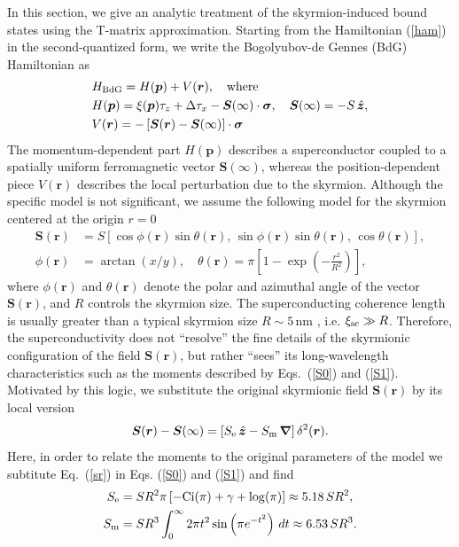 \documentclass[twocolumn,showpacs,floatfix,nofootinbib,longbibliography]{revtex4-1}
\begin{document}
In this section, we give an analytic treatment of the skyrmion-induced bound states using the T-matrix approximation. Starting from the Hamiltonian (\ref{ham}) in the second-quantized form, we write the Bogolyubov-de Gennes (BdG) Hamiltonian as 
\begin{align}
	& H_{\rm BdG} = H(\bm p) + V(\bm r),\quad {\rm where} \nonumber \\
& H(\bm p) = \xi(\bm p)\tau_z+\Delta \tau_x - \bm S(\infty)\cdot\bm\sigma,\quad \bm S(\infty) = -S\,\hat{\bm z}, \nonumber\\
& V(\bm r) = -\left[ \bm S(\bm r)-\bm S(\infty)\right]\cdot\bm\sigma \label{v0}
\end{align}
The momentum-dependent part $H(\bm p)$ describes a superconductor coupled to a spatially uniform ferromagnetic vector $\bm S(\infty)$, whereas the position-dependent piece $V(\bm r)$ describes the local perturbation due to the skyrmion. Although the specific model is not significant, we assume the following model for the skyrmion centered at the origin $r=0$
\begin{align}
	\bm S(\bm r) &= S\left[ \cos\phi(\bm r) \sin\theta(\bm r),\, \sin\phi(\bm r)\sin\theta(\bm r),\,\cos\theta(\bm r)\right], \nonumber \\   
	\phi(\bm r) &= \arctan(x/y),\quad \theta(\bm r) = \pi \left[ 1-\exp\left( -\frac{r^2}{R^2} \right) \right], 	\label{sr}
\end{align}
where $\phi(\bm r)$ and $\theta(\bm r)$ denote the polar and azimuthal angle of the vector $\bm S(\bm r)$, and $R$ controls the skyrmion size. The superconducting coherence length is usually greater than a typical skyrmion size $R\sim 5$\,nm \cite{Heinze2011,Romming2013,Bergmann2014,Brede2014,Sonntag2014,vonBergmann2015,Romming2015}, i.e. $\xi_{\rm sc}\gg R$. Therefore, the superconductivity does not ``resolve'' the fine details of the skyrmionic configuration of the field  $\bm S(\bm r)$, but rather ``sees'' its long-wavelength characteristics such as the moments described by Eqs.~(\ref{S0}) and (\ref{S1}). Motivated by this logic, we substitute the original skyrmionic field $\bm S(\bm r)$ by its local version 
\begin{equation}
	\bm S(\bm r) - \bm S(\infty) = \left[ S_{\rm e}\, \hat{\bm z} - S_{\rm m}\, \bm \nabla\right] \delta^2(\bm r).
	\label{S}
\end{equation}
Here, in order to relate the moments to the original parameters of the model we subtitute Eq.~(\ref{sr}) in Eqs. (\ref{S0}) and (\ref{S1}) and find 
\begin{align}
	S_{\rm e} &= SR^2 \pi  \left [-\text{Ci}(\pi )+\gamma +\log (\pi )\right] \approx 5.18\, SR^2, \\
	S_{\rm m} &= SR^3 \int_0^{\infty } 2 \pi  t^2 \sin \left(\pi  e^{-t^2}\right) \, dt \approx 6.53\, SR^3.
\end{align}
\end{document}
